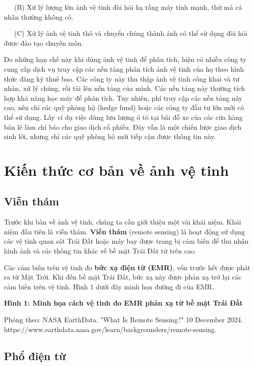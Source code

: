 ~~~(B) Xử lý lượng lớn ảnh vệ tinh đòi hỏi hạ tầng máy tính mạnh, thứ mà cá nhân thường không có.

~~~(C) Xử lý ảnh vệ tinh thô và chuyển chúng thành ảnh có thể sử dụng đòi hỏi được đào tạo chuyên môn.

Do những hạn chế này khi dùng ảnh vệ tinh để phân tích, hiện có nhiều công ty cung cấp dịch vụ truy cập các nền tảng phân tích ảnh vệ tinh của họ theo hình thức đăng ký thuê bao. Các công ty này thu thập ảnh vệ tinh công khai và tư nhân, xử lý chúng, rồi tải lên nền tảng của mình. Các nền tảng này thường tích hợp khả năng học máy để phân tích. Tuy nhiên, phí truy cập các nền tảng này cao, nên chỉ các quỹ phòng hộ (hedge fund) hoặc các công ty đầu tư lớn mới có thể sử dụng. Lấy ví dụ việc dùng lưu lượng ô tô tại bãi đỗ xe của các cửa hàng bán lẻ làm chỉ báo cho giao dịch cổ phiếu. Đây vẫn là một chiến lược giao dịch sinh lời, nhưng chỉ các quỹ phòng hộ mới tiếp cận được thông tin này.

\section{Kiến thức cơ bản về ảnh vệ tinh}

\subsection{Viễn thám}

Trước khi bàn về ảnh vệ tinh, chúng ta cần giới thiệu một vài khái niệm. Khái niệm đầu tiên là viễn thám. \textbf{Viễn thám} (remote sensing) là hoạt động sử dụng các vệ tinh quan sát Trái Đất hoặc máy bay được trang bị cảm biến để thu nhận hình ảnh và các thông tin khác về bề mặt Trái Đất từ trên cao.

Các cảm biến trên vệ tinh đo \textbf{bức xạ điện từ (EMR)}, vốn trước hết được phát ra từ Mặt Trời. Khi đến bề mặt Trái Đất, bức xạ này được phản xạ trở lại các cảm biến trên vệ tinh. Hình 1 dưới đây minh họa đường đi của EMR.

\textbf{Hình 1: Minh họa cách vệ tinh đo EMR phản xạ từ bề mặt Trái Đất}

Phỏng theo: NASA EarthData. "What Is Remote Sensing?" 10 December 2024. https://www.earthdata.nasa.gov/learn/backgrounders/remote-sensing.

\subsection{Phổ điện từ}

